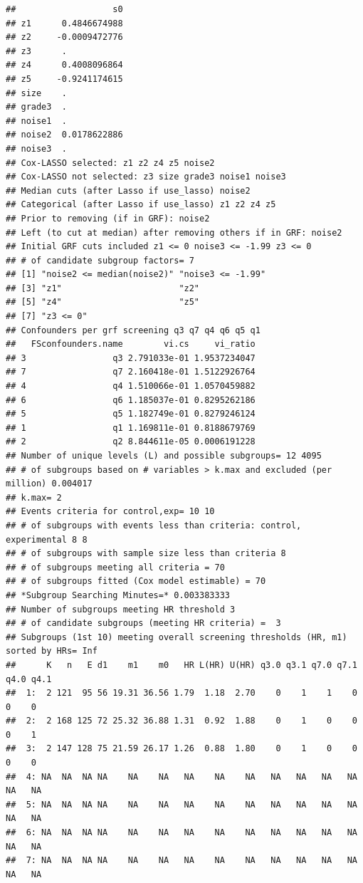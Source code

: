\documentclass[smallextended]{svjour3}
\makeatletter
\newenvironment{kframe}{%
 \def\at@end@of@kframe{}%
 \ifinner\ifhmode%
  \def\at@end@of@kframe{\end{minipage}}%
  \begin{minipage}{\columnwidth}%
 \fi\fi%
 \def\FrameCommand##1{\hskip\@totalleftmargin \hskip-\fboxsep
 \colorbox{shadecolor}{##1}\hskip-\fboxsep
     \hskip-\linewidth \hskip-\@totalleftmargin \hskip\columnwidth}%
 \MakeFramed {\advance\hsize-\width
   \@totalleftmargin\z@ \linewidth\hsize
   \@setminipage}}%
 {\par\unskip\endMakeFramed%
 \at@end@of@kframe}
\newenvironment{knitrout}{}{} %
\makeatother
\begin{document}
\begin{knitrout}
\begin{kframe}
\begin{verbatim}
##                   s0
## z1      0.4846674988
## z2     -0.0009472776
## z3      .           
## z4      0.4008096864
## z5     -0.9241174615
## size    .           
## grade3  .           
## noise1  .           
## noise2  0.0178622886
## noise3  .           
## Cox-LASSO selected: z1 z2 z4 z5 noise2 
## Cox-LASSO not selected: z3 size grade3 noise1 noise3 
## Median cuts (after Lasso if use_lasso) noise2 
## Categorical (after Lasso if use_lasso) z1 z2 z4 z5 
## Prior to removing (if in GRF): noise2 
## Left (to cut at median) after removing others if in GRF: noise2 
## Initial GRF cuts included z1 <= 0 noise3 <= -1.99 z3 <= 0 
## # of candidate subgroup factors= 7 
## [1] "noise2 <= median(noise2)" "noise3 <= -1.99"         
## [3] "z1"                       "z2"                      
## [5] "z4"                       "z5"                      
## [7] "z3 <= 0"                 
## Confounders per grf screening q3 q7 q4 q6 q5 q1 
##   FSconfounders.name        vi.cs     vi_ratio
## 3                 q3 2.791033e-01 1.9537234047
## 7                 q7 2.160418e-01 1.5122926764
## 4                 q4 1.510066e-01 1.0570459882
## 6                 q6 1.185037e-01 0.8295262186
## 5                 q5 1.182749e-01 0.8279246124
## 1                 q1 1.169811e-01 0.8188679769
## 2                 q2 8.844611e-05 0.0006191228
## Number of unique levels (L) and possible subgroups= 12 4095 
## # of subgroups based on # variables > k.max and excluded (per million) 0.004017 
## k.max= 2 
## Events criteria for control,exp= 10 10 
## # of subgroups with events less than criteria: control, experimental 8 8 
## # of subgroups with sample size less than criteria 8 
## # of subgroups meeting all criteria = 70 
## # of subgroups fitted (Cox model estimable) = 70 
## *Subgroup Searching Minutes=* 0.003383333 
## Number of subgroups meeting HR threshold 3 
## # of candidate subgroups (meeting HR criteria) =  3 
## Subgroups (1st 10) meeting overall screening thresholds (HR, m1) sorted by HRs= Inf 
##      K   n   E d1    m1    m0   HR L(HR) U(HR) q3.0 q3.1 q7.0 q7.1 q4.0 q4.1
##  1:  2 121  95 56 19.31 36.56 1.79  1.18  2.70    0    1    1    0    0    0
##  2:  2 168 125 72 25.32 36.88 1.31  0.92  1.88    0    1    0    0    0    1
##  3:  2 147 128 75 21.59 26.17 1.26  0.88  1.80    0    1    0    0    0    0
##  4: NA  NA  NA NA    NA    NA   NA    NA    NA   NA   NA   NA   NA   NA   NA
##  5: NA  NA  NA NA    NA    NA   NA    NA    NA   NA   NA   NA   NA   NA   NA
##  6: NA  NA  NA NA    NA    NA   NA    NA    NA   NA   NA   NA   NA   NA   NA
##  7: NA  NA  NA NA    NA    NA   NA    NA    NA   NA   NA   NA   NA   NA   NA

\end{verbatim}
\end{kframe}
\end{knitrout}
\end{document}
